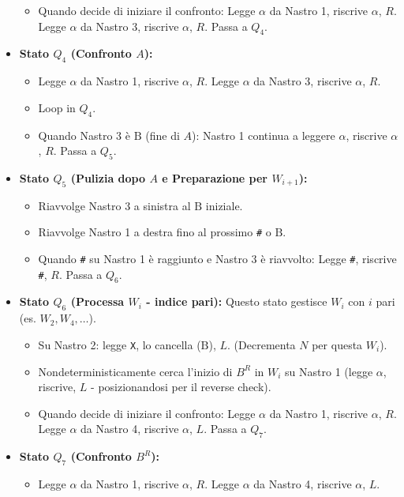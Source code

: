 \documentclass[a4paper, 11pt]{book} %
\theoremstyle{definition}
\newcommand{\B}{\text{B}} %
\begin{document}
\begin{itemize}
\begin{itemize}
            \item Quando decide di iniziare il confronto: Legge $\alpha$ da Nastro 1, riscrive $\alpha$, $R$. Legge $\alpha$ da Nastro 3, riscrive $\alpha$, $R$. Passa a $Q_4$.
        \end{itemize}
    \item \textbf{Stato $Q_4$ (Confronto $A$):}
        \begin{itemize}
            \item Legge $\alpha$ da Nastro 1, riscrive $\alpha$, $R$. Legge $\alpha$ da Nastro 3, riscrive $\alpha$, $R$.
            \item Loop in $Q_4$.
            \item Quando Nastro 3 è $\B$ (fine di $A$): Nastro 1 continua a leggere $\alpha$, riscrive $\alpha$, $R$. Passa a $Q_5$.
        \end{itemize}
    \item \textbf{Stato $Q_5$ (Pulizia dopo $A$ e Preparazione per $W_{i+1}$):}
        \begin{itemize}
            \item Riavvolge Nastro 3 a sinistra al $\B$ iniziale.
            \item Riavvolge Nastro 1 a destra fino al prossimo \texttt{\#} o $\B$.
            \item Quando \texttt{\#} su Nastro 1 è raggiunto e Nastro 3 è riavvolto: Legge \texttt{\#}, riscrive \texttt{\#}, $R$. Passa a $Q_6$.
        \end{itemize}
    \item \textbf{Stato $Q_6$ (Processa $W_i$ - indice pari):}
        Questo stato gestisce $W_i$ con $i$ pari (es. $W_2, W_4, \dots$).
        \begin{itemize}
            \item Su Nastro 2: legge \texttt{X}, lo cancella ($\B$), $L$. (Decrementa $N$ per questa $W_i$).
            \item Nondeterministicamente cerca l'inizio di $B^R$ in $W_i$ su Nastro 1 (legge $\alpha$, riscrive, $L$ - posizionandosi per il reverse check).
            \item Quando decide di iniziare il confronto: Legge $\alpha$ da Nastro 1, riscrive $\alpha$, $R$. Legge $\alpha$ da Nastro 4, riscrive $\alpha$, $L$. Passa a $Q_7$.
        \end{itemize}
    \item \textbf{Stato $Q_7$ (Confronto $B^R$):}
        \begin{itemize}
            \item Legge $\alpha$ da Nastro 1, riscrive $\alpha$, $R$. Legge $\alpha$ da Nastro 4, riscrive $\alpha$, $L$.

\end{itemize}
\end{itemize}
\end{document}
